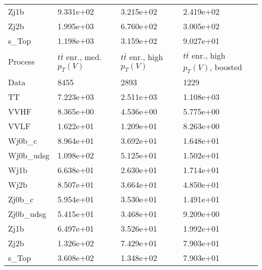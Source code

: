 \begin{table}
{\begin{tabularx}{0.8\textwidth}{|X|X|X|X|}
Zj1b & 9.331e+02 & 3.215e+02 & 2.419e+02 \\
Zj2b & 1.995e+03 & 6.760e+02 & 3.005e+02 \\
s\_Top & 1.198e+03 & 3.159e+02 & 9.027e+01 \\
\hline
\hline
Process & $t\bar{t}$ enr., med. $p_{T}(V)$ & $t\bar{t}$ enr., high $p_{T}(V)$ & $t\bar{t}$ enr., high $p_{T}(V)$, boosted \\
\hline
Data & 8455 & 2893 & 1229 \\
\hline
TT & 7.223e+03 & 2.511e+03 & 1.108e+03 \\
VVHF & 8.365e+00 & 4.536e+00 & 5.775e+00 \\
VVLF & 1.622e+01 & 1.209e+01 & 8.263e+00 \\
Wj0b\_c & 8.964e+01 & 3.692e+01 & 1.648e+01 \\
Wj0b\_udsg & 1.098e+02 & 5.125e+01 & 1.502e+01 \\
Wj1b & 6.638e+01 & 2.630e+01 & 1.714e+01 \\
Wj2b & 8.507e+01 & 3.664e+01 & 4.850e+01 \\
Zj0b\_c & 5.954e+01 & 3.530e+01 & 1.491e+01 \\
Zj0b\_udsg & 5.415e+01 & 3.468e+01 & 9.209e+00 \\
Zj1b & 6.497e+01 & 3.526e+01 & 1.992e+01 \\
Zj2b & 1.326e+02 & 7.429e+01 & 7.903e+01 \\
s\_Top & 3.608e+02 & 1.348e+02 & 7.903e+01 \\
\hline
\end{tabularx}
}
\label{tab:cr-Znn-2016}
\end{table}

